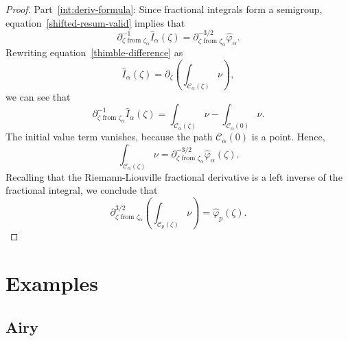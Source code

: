 \documentclass{article}
\begin{document}
\begin{proof}
Part~\eqref{int:deriv-formula}: Since fractional integrals form a semigroup, equation~\eqref{shifted-resum-valid} implies that
\[ \partial^{-1}_{\zeta \text{ from } \zeta_\alpha} \hat{I}_\alpha(\zeta) = \partial^{-3/2}_{\zeta \text{ from } \zeta_\alpha} \hat{\varphi}_\alpha. \]
Rewriting equation~\eqref{thimble-difference} as
\[ \hat{I}_\alpha(\zeta) = \partial_\zeta \left( \int_{\mathcal{C}_\alpha(\zeta)} \nu \right), \]
we can see that
\[ \partial^{-1}_{\zeta \text{ from } \zeta_\alpha} \hat{I}_\alpha(\zeta) = \int_{\mathcal{C}_\alpha(\zeta)} \nu - \int_{\mathcal{C}_\alpha(0)} \nu. \]
The initial value term vanishes, because the path $\mathcal{C}_\alpha(0)$ is a point. Hence,
\[ \int_{\mathcal{C}_\alpha(\zeta)} \nu = \partial^{-3/2}_{\zeta \text{ from } \zeta_\alpha} \hat{\varphi}_\alpha(\zeta). \]
Recalling that the Riemann-Liouville fractional derivative is a left inverse of the fractional integral, we conclude that
\[ \partial^{3/2}_{\zeta \text{ from } \zeta_\alpha} \left( \int_{\mathcal{C}_p(\zeta)} \nu \right) = \hat{\varphi}_p(\zeta). \]
\end{proof}


\section{Examples}

\subsection{Airy}
\end{document}
